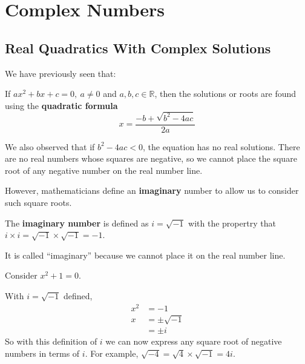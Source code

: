 \documentclass[11pt,a4paper]{book}
\newcommand{\R}{\mathbb{R}}
\begin{document}
\chapter{Complex Numbers}
\section{Real Quadratics With Complex Solutions}

We have previously seen that:

\medskip{}

\begin{tcolorbox}[colback=blue!5, colframe=black, boxrule=.4pt, sharpish corners]

If $ax^{2}+bx+c=0,\:a\neq0$ and $a,b,c\in\R$, then the solutions
or roots are found using the \textbf{quadratic formula}
\[
{\displaystyle x=\frac{-b+\sqrt{b^{2}-4ac}}{2a}}
\]
\end{tcolorbox}
We also observed that if $b^{2}-4ac<0$, the equation has no real
solutions. There are no real numbers whose squares are negative, so
we cannot place the square root of any negative number on the real
number line.

However, mathematicians define an \textbf{imaginary} number to allow
us to consider such square roots.

\medskip{}

\begin{tcolorbox}[colback=blue!5, colframe=black, boxrule=.4pt, sharpish corners]

The\textbf{ imaginary number} is defined as $i=\sqrt{-1}$
with the propertry that $i\times i=\sqrt{-1}\times\sqrt{-1}=-1$.
\end{tcolorbox}

It is called ``imaginary'' because we cannot place it on the real
number line.

Consider $x^{2}+1=0$.

With $i=\sqrt{-1}$ defined,
\begin{align*}
x^{2} & =-1\\
x & =\pm\sqrt{-1}\\
 & =\pm i
\end{align*}
So with this definition of $i$ we can now express any square root
of negative numbers in terms of $i$. For example, $\sqrt{-4}=\sqrt{4}\times\sqrt{-1}=4i$.

\newpage
\end{document}
